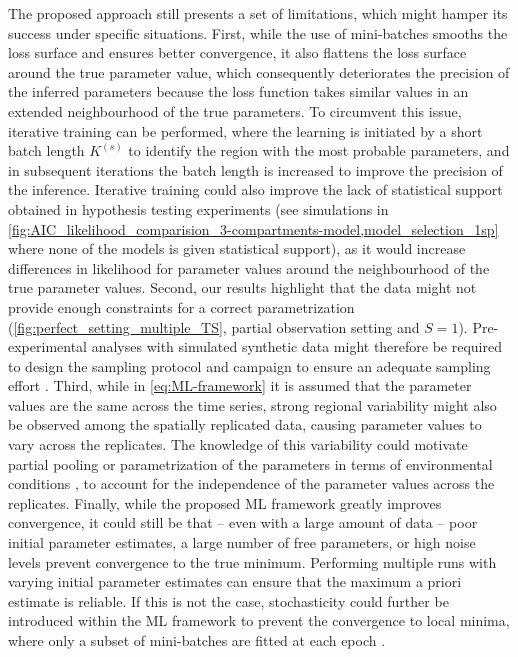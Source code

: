 The proposed approach still presents a set of limitations, which might hamper its success under specific situations. 
% 
First, while the use of mini-batches smooths the loss surface and ensures better convergence, it also flattens the loss surface around the true parameter value, which consequently deteriorates the precision of the inferred parameters because the loss function takes similar values in an extended neighbourhood of the true parameters. 
To circumvent this issue, iterative training can be performed, where the learning is initiated by a short batch length $K^{(s)}$ to identify the region with the most probable parameters, and in subsequent iterations the batch length is increased to improve the precision of the inference. 
% 
Iterative training could also improve the lack of statistical support obtained in hypothesis testing experiments (see simulations in \cref{fig:AIC_likelihood_comparision_3-compartments-model,model_selection_1sp} where none of the models is given statistical support), as it would increase differences in likelihood for parameter values around the neighbourhood of the true parameter values.
% 
Second, our results highlight that the data might not provide enough constraints for a correct parametrization (\cref{fig:perfect_setting_multiple_TS}, partial observation setting and $S=1$). Pre-experimental analyses with simulated synthetic data might therefore be required to design the sampling protocol and campaign to ensure an adequate sampling effort \citep{Banks2017,Laubmeier2018}. %
%
Third, while in \cref{eq:ML-framework} it is assumed that the parameter values are the same across the time series, strong regional variability might also be observed among the spatially replicated data, causing parameter values to vary across the replicates. The knowledge of this variability could motivate partial pooling \citep{Beaumont2010} or parametrization of the parameters in terms of environmental conditions \citep{Pahlow2008}, to account for the independence of the parameter values across the replicates.
%
Finally, while the proposed ML framework greatly improves convergence, it could still be that -- even with a large amount of data -- poor initial parameter estimates, a large number of free parameters, or high noise levels prevent convergence to the true minimum. Performing multiple runs with varying initial parameter estimates can ensure that the maximum a priori estimate is reliable. If this is not the case, stochasticity could further be introduced within the ML framework to prevent the convergence to local minima, where only a subset of mini-batches are fitted at each epoch \citep{bottou2012stochastic}.

